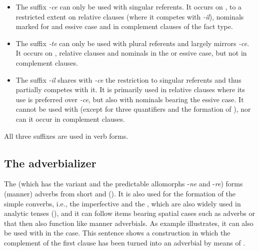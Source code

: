 \begin{itemize}
	\item	The suffix \textit{-ce} can only be used with singular referents. It occurs on , to a restricted extent on relative clauses (where it competes with \textit{-il}), nominals marked for  and essive case and in complement clauses of the fact type.
	\item	The suffix \textit{-te} can only be used with plural referents and largely mirrors \textit{-ce}. It occurs on , relative clauses and nominals in the  or essive case, but not in complement clauses.
	\item	The suffix \textit{-il} shares with \textit{-ce} the restriction to singular referents and thus partially competes with it. It is primarily used in relative clauses where its use is preferred over \textit{-ce}, but also with nominals bearing the essive case. It cannot be used with  (except for three quantifiers and the formation of ), nor can it occur in complement clauses.
\end{itemize}
 
All three suffixes are used in  verb forms.


\subsection{The adverbializer }
\label{ssec:The adverbializer -le}

The   (which has the variant  and the predictable allomorphs -\textit{ne} and -\textit{re}) forms (manner) adverbs from short  and  (). It is also used for the formation of the simple converbs, i.e., the imperfective and the , which are also widely used in analytic tenses (), and it can follow items bearing spatial cases such as adverbs  or   that then also function like manner adverbials. As example  illustrates, it can also be used with  in the  case. This sentence shows a  construction in which the  complement of the first clause has been turned into an adverbial by means of .

